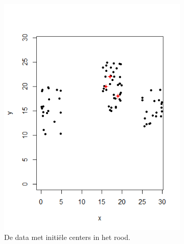 \documentclass[a4paper,12pt]{article}
\theoremstyle{definition}
\begin{document}
\begin{figure}[!ht]
    \centering
    \begin{subfigure}[t]{0.3\textwidth}
        \includegraphics[width=\textwidth]{kmeans.png}
        \caption{De data met initiële centers in het rood.}
    \end{subfigure}
    \begin{subfigure}[t]{0.3\textwidth}

\end{subfigure}
\end{figure}
\end{document}
